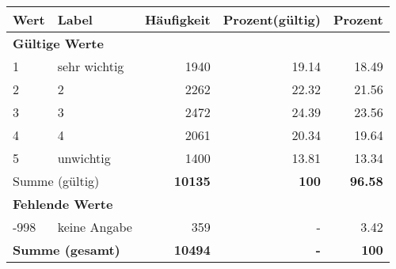      \begin{longtable}{lXrrr}
     \toprule
     \textbf{Wert} & \textbf{Label} & \textbf{Häufigkeit} & \textbf{Prozent(gültig)} & \textbf{Prozent} \\
     \endhead
     \midrule
     \multicolumn{5}{l}{\textbf{Gültige Werte}}\\

     1 &
     \multicolumn{1}{X}{ sehr wichtig   } &


       \num{1940} &
       \num[round-mode=places,round-precision=2]{19,14} &
         \num[round-mode=places,round-precision=2]{18,49} \\

     2 &
     \multicolumn{1}{X}{ 2   } &


       \num{2262} &
       \num[round-mode=places,round-precision=2]{22,32} &
         \num[round-mode=places,round-precision=2]{21,56} \\

     3 &
     \multicolumn{1}{X}{ 3   } &


       \num{2472} &
       \num[round-mode=places,round-precision=2]{24,39} &
         \num[round-mode=places,round-precision=2]{23,56} \\

     4 &
     \multicolumn{1}{X}{ 4   } &


       \num{2061} &
       \num[round-mode=places,round-precision=2]{20,34} &
         \num[round-mode=places,round-precision=2]{19,64} \\

     5 &
     \multicolumn{1}{X}{ unwichtig   } &


       \num{1400} &
       \num[round-mode=places,round-precision=2]{13,81} &
         \num[round-mode=places,round-precision=2]{13,34} \\
     \midrule
     \multicolumn{2}{l}{Summe (gültig)} &
       \textbf{\num{10135}} &
     \textbf{100} &
       \textbf{\num[round-mode=places,round-precision=2]{96,58}} \\
     \multicolumn{5}{l}{\textbf{Fehlende Werte}}\\
       -998 &
       keine Angabe &
         \num{359} &
        - &
         \num[round-mode=places,round-precision=2]{3,42} \\
     \midrule
     \multicolumn{2}{l}{\textbf{Summe (gesamt)}} &
          \textbf{\num{10494}} &
        \textbf{-} &
        \textbf{100} \\
     \bottomrule
     \end{longtable}
     
